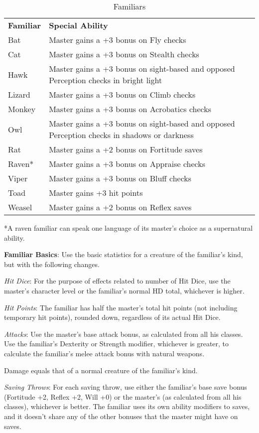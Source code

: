 \begin{table}
 \sffamily
 \caption{Familiars}
 \begin{tabular}{ll}
  \textbf{Familiar} & \textbf{Special Ability} \\
Bat & Master gains a +3 bonus on Fly checks\\
Cat & Master gains a +3 bonus on Stealth checks\\
Hawk & Master gains a +3 bonus on sight-based and opposed Perception checks in bright light\\
Lizard & Master gains a +3 bonus on Climb checks\\
Monkey & Master gains a +3 bonus on Acrobatics checks\\
Owl & Master gains a +3 bonus on sight-based and opposed Perception checks in shadows or darkness\\
Rat & Master gains a +2 bonus on Fortitude saves\\
Raven* & Master gains a +3 bonus on Appraise checks\\
Viper & Master gains a +3 bonus on Bluff checks\\
Toad & Master gains +3 hit points\\
Weasel & Master gains a +2 bonus on Reflex saves\\
 \end{tabular}
*A raven familiar can speak one language of its master's choice as a supernatural ability.
\end{table}

				
\textbf{Familiar Basics}: Use the basic statistics for a creature of the familiar's kind, but with the following changes.
				
\textit{Hit Dice}: For the purpose of effects related to number of Hit Dice, use the master's character level or the familiar's normal HD total, whichever is higher.
				
\textit{Hit Points}: The familiar has half the master's total hit points (not including temporary hit points), rounded down, regardless of its actual Hit Dice.
				
\textit{Attacks}: Use the master's base attack bonus, as calculated from all his classes. Use the familiar's Dexterity or Strength modifier, whichever is greater, to calculate the familiar's melee attack bonus with natural weapons. 
				
Damage equals that of a normal creature of the familiar's kind.
				
\textit{Saving Throws}: For each saving throw, use either the familiar's base save bonus (Fortitude +2, Reflex +2, Will +0) or the master's (as calculated from all his classes), whichever is better. The familiar uses its own ability modifiers to saves, and it doesn't share any of the other bonuses that the master might have on saves.
				

